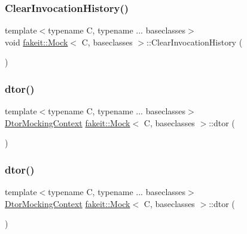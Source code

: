 \subsubsection{\texorpdfstring{ClearInvocationHistory()}{ClearInvocationHistory()}\hspace{0.1cm}{\footnotesize\ttfamily [9/9]}}
{\footnotesize\ttfamily template$<$typename C, typename ... baseclasses$>$ \\
void \mbox{\hyperlink{classfakeit_1_1Mock}{fakeit\+::\+Mock}}$<$ C, baseclasses $>$\+::Clear\+Invocation\+History (\begin{DoxyParamCaption}{ }\end{DoxyParamCaption})\hspace{0.3cm}{\ttfamily [inline]}}

\mbox{\label{classfakeit_1_1Mock_a5c25c5db6e0e1b955137a1330f7348b9}} 
\subsubsection{\texorpdfstring{dtor()}{dtor()}\hspace{0.1cm}{\footnotesize\ttfamily [1/9]}}
{\footnotesize\ttfamily template$<$typename C, typename ... baseclasses$>$ \\
\mbox{\hyperlink{classfakeit_1_1DtorMockingContext}{Dtor\+Mocking\+Context}} \mbox{\hyperlink{classfakeit_1_1Mock}{fakeit\+::\+Mock}}$<$ C, baseclasses $>$\+::dtor (\begin{DoxyParamCaption}{ }\end{DoxyParamCaption})\hspace{0.3cm}{\ttfamily [inline]}}

\mbox{\label{classfakeit_1_1Mock_a5c25c5db6e0e1b955137a1330f7348b9}} 
\subsubsection{\texorpdfstring{dtor()}{dtor()}\hspace{0.1cm}{\footnotesize\ttfamily [2/9]}}
{\footnotesize\ttfamily template$<$typename C, typename ... baseclasses$>$ \\
\mbox{\hyperlink{classfakeit_1_1DtorMockingContext}{Dtor\+Mocking\+Context}} \mbox{\hyperlink{classfakeit_1_1Mock}{fakeit\+::\+Mock}}$<$ C, baseclasses $>$\+::dtor (\begin{DoxyParamCaption}{ }\end{DoxyParamCaption})\hspace{0.3cm}{\ttfamily [inline]}}

